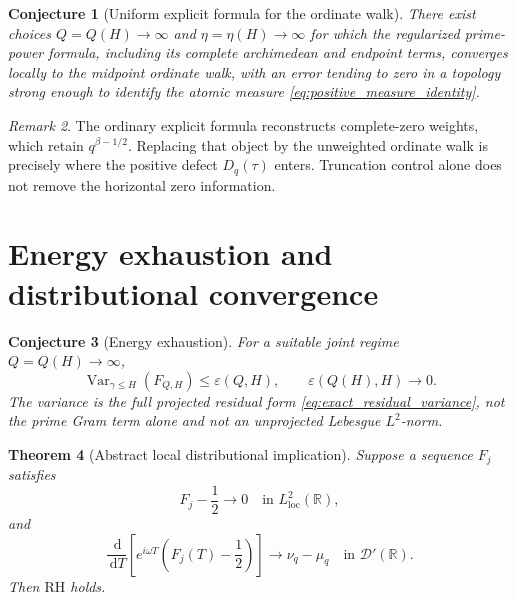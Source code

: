 \documentclass[11pt]{amsart}
\numberwithin{equation}{section}
\theoremstyle{plain}
\newtheorem{theorem}{Theorem}[section]
\newtheorem{conjecture}[theorem]{Conjecture}
\theoremstyle{definition}
\theoremstyle{remark}
\newtheorem{remark}[theorem]{Remark}
\DeclareMathOperator{\Var}{Var}
\newcommand{\RH}{\mathrm{RH}}
\newcommand{\1}{\mathbf{1}}
\newcommand{\dd}{\,\mathrm{d}}
\begin{document}
\begin{conjecture}[Uniform explicit formula for the ordinate walk]
\label{conj:uniform_explicit_formula}
There exist choices \(Q=Q(H)\to\infty\) and
\(\eta=\eta(H)\to\infty\) for which the regularized prime-power formula,
including its complete archimedean and endpoint terms, converges locally
to the midpoint ordinate walk, with an error tending to zero in a
topology strong enough to identify the atomic measure
\eqref{eq:positive_measure_identity}.
\end{conjecture}

\begin{remark}
\label{rem:uniform_bridge_is_RH_interface}
The ordinary explicit formula reconstructs complete-zero weights, which
retain \(q^{\beta-1/2}\).  Replacing that object by the unweighted
ordinate walk is precisely where the positive defect
\(D_q(\tau)\) enters.  Truncation control alone does not remove the
horizontal zero information.
\end{remark}

\section{Energy exhaustion and distributional convergence}
\label{sec:two_main_lemmas}

\begin{conjecture}[Energy exhaustion]
\label{conj:energy_exhaustion}
For a suitable joint regime \(Q=Q(H)\to\infty\),
\begin{equation}
\Var_{\gamma\leq H}(F_{Q,H})
\leq
\varepsilon(Q,H),
\qquad
\varepsilon(Q(H),H)\to0.
\label{eq:energy_exhaustion}
\end{equation}
The variance is the full projected residual form
\eqref{eq:exact_residual_variance}, not the prime Gram term alone and not
an unprojected Lebesgue \(L^2\)-norm.
\end{conjecture}

\begin{theorem}[Abstract local distributional implication]
\label{thm:distributional_implication}
Suppose a sequence \(F_j\) satisfies
\begin{equation}
F_j-\frac12\longrightarrow0
\quad\text{in }L^2_{\mathrm{loc}}(\mathbb R),
\label{eq:local_L2_convergence}
\end{equation}
and
\begin{equation}
\frac{\dd}{\dd T}
\left[
e^{i\omega T}
\left(F_j(T)-\frac12\right)
\right]
\longrightarrow
\nu_q-\mu_q
\quad\text{in }\mathcal D'(\mathbb R).
\label{eq:derivative_distributional_identification}
\end{equation}
Then \(\RH\) holds.
\end{theorem}
\end{document}

